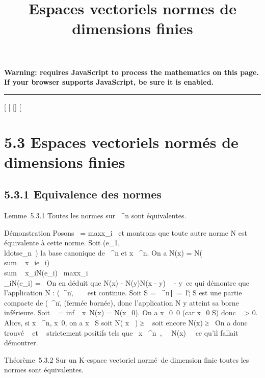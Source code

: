 \documentclass[]{article}
\title{Espaces vectoriels normes de dimensions finies}
\author{}
\date{}
\begin{document}
\maketitle

\textbf{Warning: 
requires JavaScript to process the mathematics on this page.\\ If your
browser supports JavaScript, be sure it is enabled.}

\begin{center}\rule{3in}{0.4pt}\end{center}

[
[
[]
[

\section{5.3 Espaces vectoriels normés de dimensions finies}

\subsection{5.3.1 Equivalence des normes}

Lemme~5.3.1 Toutes les normes sur ~^n sont équivalentes.

Démonstration Posons
\x\
= maxx_i~ et
montrons que toute autre norme N est équivalente à cette norme. Soit
(e_1,\\ldotse_n~)
la base canonique de ~^n et x \in {}~^n. On a N(x) =
N(\\sum ~
x_ie_i)
\leq\\sum ~
x_iN(e_i)
\leq\
maxx_i\\\sum
 _iN(e_i) =
\beta~\x\. On en déduit que
N(x) - N(y)\leq N(x - y) \leq \beta~\x
- y\ ce qui démontre que l'application N :
(~^n,\.\) \rightarrow~
~ est continue. Soit S = \x \in
\mathbb{R}~^n∣\x\
= 1\~; S est une partie compacte de
(~^n,\.\)
(fermée bornée), donc l'application N y atteint sa borne inférieure.
Soit \alpha~ = inf _x\inS~N(x) =
N(x_0). On a x_0\neq~0 (car
x_0 \in S) donc \alpha~ > 0. Alors, si x \in \mathbb{R}~^n,
x\neq~0, on a  x \over
\x\ \in S soit N( x
\over
\x\ ) ≥ \alpha~ soit
encore N(x) ≥ \alpha~\x\. On
a donc trouvé \alpha~ et \beta~ strictement positifs tels que
\forall~x \in {}~^n~,
\alpha~\x\ \leq N(x) \leq
\beta~\x\, ce qu'il fallait
démontrer.

Théorème~5.3.2 Sur un K-espace vectoriel normé~de dimension finie toutes
les normes sont équivalentes.
\end{document}
